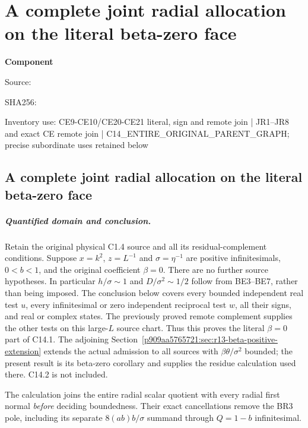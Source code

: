\chapter{A complete joint radial allocation on the literal beta-zero face}
\label{component:pb1104217f67b}
\noindent\textbf{Component }\par
{\small\noindent Source: \par}
{\small\noindent SHA256: \par}
{\small\noindent Inventory use: CE9-CE10/CE20-CE21 literal, sign and remote join | JR1--JR8 and exact CE remote join | C14\_\allowbreak{}ENTIRE\_\allowbreak{}ORIGINAL\_\allowbreak{}PARENT\_\allowbreak{}GRAPH; precise subordinate uses retained below\par}
\medskip
\section{A complete joint radial allocation on the literal beta-zero face}
\label{pb1104217f67b:sec:r13-joint-radial-beta-zero}

\paragraph{Quantified domain and conclusion.}
Retain the original physical C1.4 source and all its residual-complement
conditions. Suppose $x=k^2$, $z=L^{-1}$ and $\sigma=\eta^{-1}$ are
positive infinitesimals, $0<b<1$, and the original coefficient $\beta=0$.
There are no further source hypotheses. In particular $h/\sigma\sim1$
and $D/\sigma^2\sim1/2$ follow from BE3--BE7, rather than being imposed.
The conclusion below covers every bounded independent real test $u$,
every infinitesimal or zero independent reciprocal test $w$, all their
signs, and real or complex states. The previously proved remote
complement supplies the other tests on this large-$L$ source chart.
Thus this proves the literal $\beta=0$ part of C14.1. The adjoining
Section~\ref{p909aa5765721:sec:r13-beta-positive-extension} extends the actual admission
to all sources with $\beta\theta/\sigma^2$ bounded; the present result
is its beta-zero corollary and supplies the residue calculation used
there. C14.2 is not included.

The calculation joins the entire radial scalar quotient with every
radial first normal \emph{before} deciding boundedness. Their exact
cancellations remove the BR3 pole, including its separate
$8(ab)b/\sigma$ summand through $Q=1-b$ infinitesimal.

